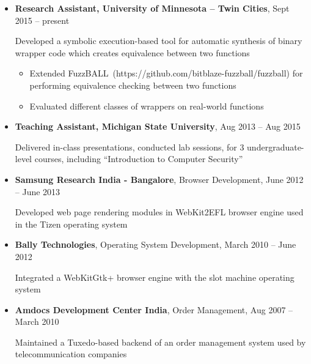 \documentclass[letterpaper,10pt]{article}
\begin{document}
\begin{itemize}
\item 
\textbf{Research Assistant, University of Minnesota -- Twin Cities}, Sept 2015 -- present 

Developed a symbolic execution-based tool for automatic synthesis of binary wrapper code which creates equivalence between two functions 
\begin{itemize}
\item Extended FuzzBALL~(https://github.com/bitblaze-fuzzball/fuzzball) for performing equivalence checking between two functions
\item Evaluated different classes of wrappers on real-world functions
\end{itemize}

\item
\textbf{Teaching Assistant, Michigan State University}, Aug 2013 -- Aug 2015

Delivered in-class presentations, conducted lab sessions, for 3 undergraduate-level courses, including ``Introduction to Computer Security''

\item
\textbf{Samsung Research India - Bangalore}, Browser Development, June 2012 -- June 2013

Developed web page rendering modules in WebKit2EFL browser engine used in the Tizen operating system

\item
\textbf{Bally Technologies}, Operating System Development, March 2010 -- June 2012

Integrated a WebKitGtk+ browser engine with the slot machine operating system


\item
\textbf{Amdocs Development Center India}, Order Management, Aug 2007 -- March 2010

Maintained a Tuxedo-based backend of an order management system used by telecommunication companies


\end{itemize}
\end{document}
